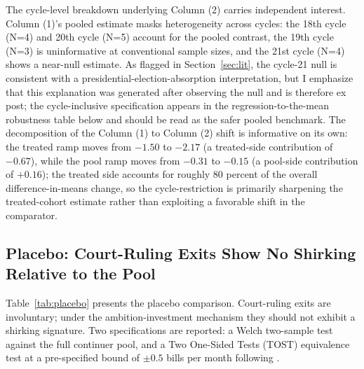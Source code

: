 \documentclass[11pt]{article}
\begin{document}
The cycle-level breakdown underlying Column (2) carries independent interest. Column (1)'s pooled estimate masks heterogeneity across cycles: the 18th cycle (N=4) and 20th cycle (N=5) account for the pooled contrast, the 19th cycle (N=3) is uninformative at conventional sample sizes, and the 21st cycle (N=4) shows a near-null estimate. As flagged in Section~\ref{sec:lit}, the cycle-21 null is consistent with a presidential-election-absorption interpretation, but I emphasize that this explanation was generated after observing the null and is therefore ex post; the cycle-inclusive specification appears in the regression-to-the-mean robustness table below and should be read as the safer pooled benchmark. The decomposition of the Column (1) to Column (2) shift is informative on its own: the treated ramp moves from $-1.50$ to $-2.17$ (a treated-side contribution of $-0.67$), while the pool ramp moves from $-0.31$ to $-0.15$ (a pool-side contribution of $+0.16$); the treated side accounts for roughly 80 percent of the overall difference-in-means change, so the cycle-restriction is primarily sharpening the treated-cohort estimate rather than exploiting a favorable shift in the comparator.

\subsection{Placebo: Court-Ruling Exits Show No Shirking Relative to the Pool}

Table~\ref{tab:placebo} presents the placebo comparison. Court-ruling exits are involuntary; under the ambition-investment mechanism they should not exhibit a shirking signature. Two specifications are reported: a Welch two-sample test against the full continuer pool, and a Two One-Sided Tests (TOST) equivalence test at a pre-specified bound of $\pm 0.5$ bills per month following \citet{titiunik2017}.
\end{document}
